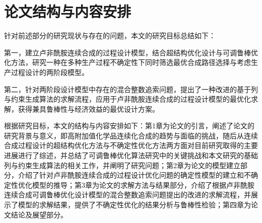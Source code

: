 \section{论文结构与内容安排}
针对前述部分的研究现状与存在的问题，本文的研究目标总结如下：

第一，建立卢非酰胺连续合成的过程设计模型，结合超结构优化设计与可调鲁棒优化方法，研究一种在多种生产过程不确定性下同时筛选最优合成路径选择与考虑生产过程设计的两阶段模型。

第二，针对两阶段设计模型中存在的混合整数追索问题，提出了一种改进的基于列与约束生成算法的求解流程，应用于卢非酰胺连续合成的过程设计模型的最优化求解，获得兼具鲁棒性与经济效益的最优设计方案。

根据研究目标，本文的结构与内容安排如下：第1章为论文的引言，阐述了论文的研究背景与意义，即高附加值化学品连续化合成的趋势与面临的挑战，随后从连续合成过程设计的超结构优化方法与不确定性优化方法两方面对目前研究取得的主要进展进行了综述，并总结了可调鲁棒优化算法研究中的关键挑战和本文研究的基础列与约束生成算法的相关工作，并阐明了研究问题；第2章为论文的模型建立部分，介绍了针对卢非酰胺连续合成的过程设计优化问题的确定性模型的建立和不确定性优化模型的推导；第3章为论文的求解方法与结果部分，介绍了根据卢非酰胺连续合成可调鲁棒优化设计模型的混合整数追索问题提出的改进的求解流程，并展示了模型的求解结果，提供了不确定性优化的结果分析与鲁棒性检验；第四章为论文结论及展望部分。




